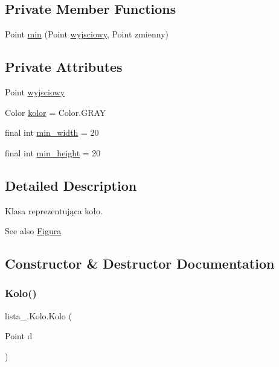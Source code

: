 \subsection*{Private Member Functions}
\begin{DoxyCompactItemize}
\item 
Point \mbox{\hyperlink{classlista__5_1_1_kolo_a4ec5879d3ec849a75bcb1690ed2a0c18}{min}} (Point \mbox{\hyperlink{classlista__5_1_1_kolo_a6deef87b266a0c6c98fc920af90eb81a}{wyjsciowy}}, Point zmienny)
\end{DoxyCompactItemize}
\subsection*{Private Attributes}
\begin{DoxyCompactItemize}
\item 
Point \mbox{\hyperlink{classlista__5_1_1_kolo_a6deef87b266a0c6c98fc920af90eb81a}{wyjsciowy}}
\item 
Color \mbox{\hyperlink{classlista__5_1_1_kolo_ae42f8858e1a2278cc04b3190a2ee9fcb}{kolor}} = Color.\+G\+R\+AY
\item 
final int \mbox{\hyperlink{classlista__5_1_1_kolo_aed784d027c521026966005272339b054}{min\+\_\+width}} = 20
\item 
final int \mbox{\hyperlink{classlista__5_1_1_kolo_a47a917d7de6905904717534ccd188037}{min\+\_\+height}} = 20
\end{DoxyCompactItemize}


\subsection{Detailed Description}
Klasa reprezentująca koło. \begin{DoxySeeAlso}{See also}
\mbox{\hyperlink{interfacelista__5_1_1_figura}{Figura}} 
\end{DoxySeeAlso}


\subsection{Constructor \& Destructor Documentation}
\mbox{\label{classlista__5_1_1_kolo_abbb4dd96b93d0ea773221a321e4af943}} 
\subsubsection{\texorpdfstring{Kolo()}{Kolo()}}
{\footnotesize\ttfamily lista\+\_.\+Kolo.\+Kolo (\begin{DoxyParamCaption}\item[{Point}]{d }\end{DoxyParamCaption})}

